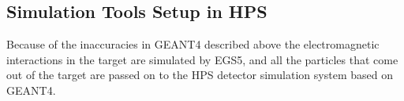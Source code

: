 \subsection*{Simulation Tools Setup in HPS}

Because of the inaccuracies in GEANT4 described above the electromagnetic interactions in the target are simulated 
by EGS5, and all the particles that come out of the target are passed on to the HPS detector 
simulation system based on GEANT4.


%


% 

